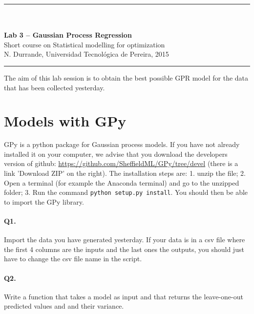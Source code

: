 \documentclass[12pt]{scrartcl}
\begin{document}
\begin{center}
	\rule{\textwidth}{1pt}
	\\ \ \\
	{\LARGE \textbf{Lab 3 -- Gaussian Process Regression}}\\ 
	\vspace{3mm}
	{\large Short course on Statistical modelling for optimization\\ \vspace{3mm}}
	{\normalsize N. Durrande, Universidad Tecnol\'ogica de Pereira, 2015}\\ 
	\vspace{3mm}
	\rule{\textwidth}{1pt}
	\vspace{5mm}
\end{center}
The aim of this lab session is to obtain the best possible GPR model for the data that has been collected yesterday.

\section{Models with GPy}
GPy is a python package for Gaussian process models. If you have not already installed it on your computer, we advise that you download the developers version of github:
\url{https://github.com/SheffieldML/GPy/tree/devel} (there is a link 'Download ZIP' on the right). The installation steps are: 1. unzip the file; 2. Open a terminal (for example the Anaconda terminal) and go to the unzipped folder; 3. Run the command \texttt{python setup.py install}. You should then be able to import the GPy library.

\paragraph{Q1.} Import the data you have generated yesterday. If your data is in a csv file where the first 4 columns are the inputs and the last ones the outputs, you should just have to change the csv file name in the script.

\paragraph{Q2.} Write a function that takes a model as input and that returns the leave-one-out predicted values and and their variance. 
\end{document}
